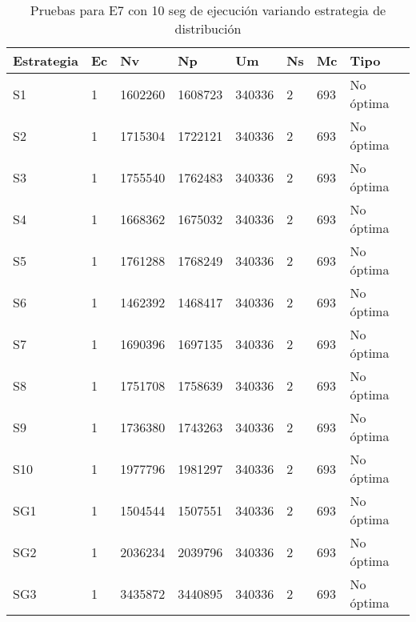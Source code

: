 \begin{center}
\begin{longtable}{|p{3cm}|p{1.0cm}|p{1.6cm}|p{1.6cm}|p{1.1cm}|p{1.1cm}|p{1.1cm}|p{2.7cm}|}
	\caption{Pruebas para E7 con 10 seg de ejecución variando estrategia de distribución} \\
	\hline
	\cellcolor[gray]{0.9} \textbf{Estrategia} & \cellcolor[gray]{0.9}\textbf{Ec} & \cellcolor[gray]{0.9}\textbf{Nv} & \cellcolor[gray]{0.9}\textbf{Np} & \cellcolor[gray]{0.9}\textbf{Um} & \cellcolor[gray]{0.9}\textbf{Ns} &  \cellcolor[gray]{0.9}\textbf{Mc} & \cellcolor[gray]{0.9}\textbf{Tipo}\\	\hline
	S1& 1 &1602260  &1608723 &340336  &2 &693&No óptima \\
	\hline
	S2& 1 &1715304  &1722121 &340336  &2 &693&No óptima \\
	\hline
	S3& 1 &1755540  &1762483 &340336  &2 &693&No óptima \\
	\hline
	S4& 1 &1668362  &1675032 &340336  &2 &693&No óptima \\
	\hline
	S5& 1 &1761288  &1768249 &340336  &2 &693&No óptima \\
	\hline
	S6& 1 &1462392  &1468417 &340336  &2 &693&No óptima \\
	\hline
	S7& 1 &1690396  &1697135 &340336  &2 &693&No óptima \\
	\hline
	S8& 1 &1751708  &1758639 &340336  &2 &693&No óptima \\
	\hline
	S9& 1 &1736380  &1743263 &340336  &2 &693&No óptima \\
	\hline
	S10& 1 &1977796  &1981297 &340336  &2 &693&No óptima \\
	\hline
	SG1& 1 &1504544  &1507551 &340336  &2 &693&No óptima \\
	\hline
	SG2& 1 &2036234  &2039796 &340336  &2 &693&No óptima \\
	\hline
	SG3& 1 &3435872  &3440895 &340336  &2 &693&No óptima \\
	\hline
\end{longtable}	
\end{center}

